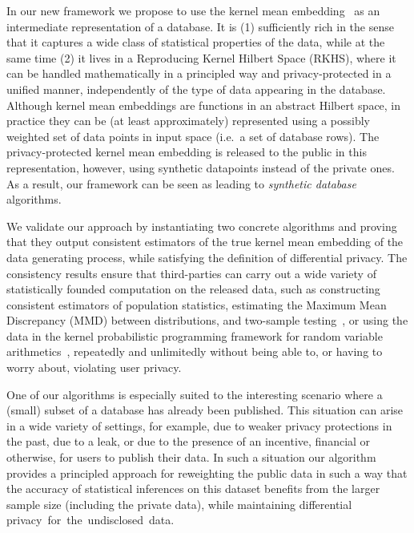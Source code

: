 \documentclass{article}
\theoremstyle{plain}
\theoremstyle{remark}
\theoremstyle{definition}
\begin{document}
In our new framework we propose to use the kernel mean embedding~\cite{smola_hilbert_2007} as an intermediate representation of a database.
It is (1) sufficiently rich in the sense that it captures a wide class of statistical properties of the data, while at the same time (2) it lives in a Reproducing Kernel Hilbert Space (RKHS), where it can be handled mathematically in a principled way and privacy-protected in a unified manner, independently of the type of data appearing in the database.
Although kernel mean embeddings are functions in an abstract Hilbert space, in practice they can be (at least approximately) represented using a possibly weighted set of data points in input space (i.e.~a set of database rows).
The privacy-protected kernel mean embedding is released to the public in this representation, however, using synthetic datapoints instead of the private ones. As a result, our framework can be seen as leading to \emph{synthetic database} algorithms.

We validate our approach by instantiating two concrete algorithms and proving that they output consistent estimators of the true kernel mean embedding of the data generating process, while satisfying the definition of differential privacy. The consistency results ensure that third-parties can carry out a wide variety of statistically founded computation on the released data, such as constructing consistent estimators of population statistics, estimating the Maximum Mean Discrepancy (MMD) between distributions, and two-sample testing~\citep{gretton_kernel_2012}, or using the data in the kernel probabilistic programming framework for random variable arithmetics~\citep[Section 3]{scholkopf_computing_2015, scibior_consistent_2016}, repeatedly and unlimitedly without being able to, or having to worry about, violating user privacy.

One of our algorithms is especially suited to the interesting scenario where a (small) subset of a database has already been published. This situation can arise in a wide variety of settings, for example, due to weaker privacy protections in the past, due to a leak, or due to the presence of an incentive, financial or otherwise, for users to publish their data. In such a situation our algorithm provides a principled approach for reweighting the public data in such a way that the accuracy of statistical inferences on this dataset benefits from the larger sample size (including the private data), while maintaining differential \mbox{privacy for the undisclosed data}.
\end{document}
